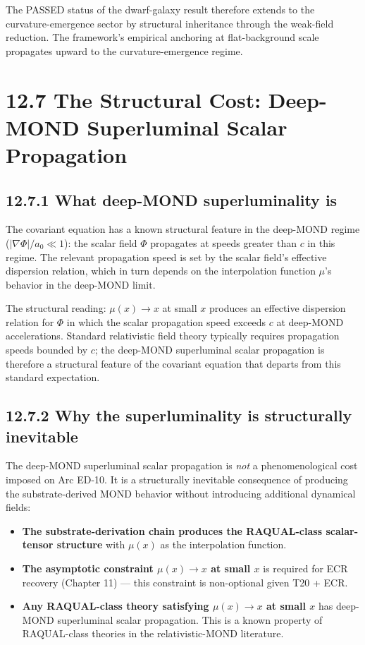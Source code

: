 \documentclass[11pt]{book}
\begin{document}
The PASSED status of the dwarf-galaxy result therefore extends to the curvature-emergence sector by structural inheritance through the weak-field reduction. The framework's empirical anchoring at flat-background scale propagates upward to the curvature-emergence regime.

\section{12.7 The Structural Cost: Deep-MOND Superluminal Scalar Propagation}

\subsection{12.7.1 What deep-MOND superluminality is}

The covariant equation has a known structural feature in the deep-MOND regime ($|\nabla\Phi|/a_0 \ll 1$): the scalar field $\Phi$ propagates at speeds greater than $c$ in this regime. The relevant propagation speed is set by the scalar field's effective dispersion relation, which in turn depends on the interpolation function $\mu$'s behavior in the deep-MOND limit.

The structural reading: $\mu(x) \to x$ at small $x$ produces an effective dispersion relation for $\Phi$ in which the scalar propagation speed exceeds $c$ at deep-MOND accelerations. Standard relativistic field theory typically requires propagation speeds bounded by $c$; the deep-MOND superluminal scalar propagation is therefore a structural feature of the covariant equation that departs from this standard expectation.

\subsection{12.7.2 Why the superluminality is structurally inevitable}

The deep-MOND superluminal scalar propagation is \textit{not} a phenomenological cost imposed on Arc ED-10. It is a structurally inevitable consequence of producing the substrate-derived MOND behavior without introducing additional dynamical fields:

\begin{itemize}
\item \textbf{The substrate-derivation chain produces the RAQUAL-class scalar-tensor structure} with $\mu(x)$ as the interpolation function.
\item \textbf{The asymptotic constraint $\mu(x) \to x$ at small $x$} is required for ECR recovery (Chapter 11) — this constraint is non-optional given T20 + ECR.
\item \textbf{Any RAQUAL-class theory satisfying $\mu(x) \to x$ at small $x$} has deep-MOND superluminal scalar propagation. This is a known property of RAQUAL-class theories in the relativistic-MOND literature.
\end{itemize}
\end{document}
